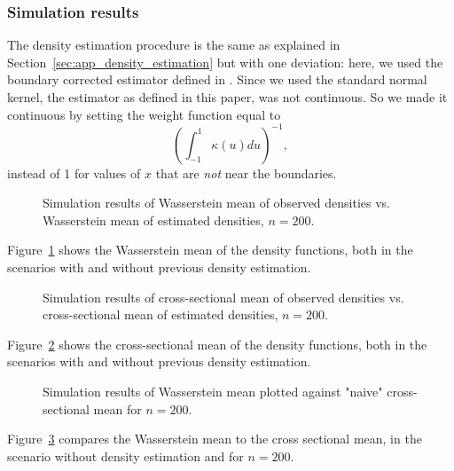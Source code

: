 \subsubsection{Simulation results}
\label{sec:illustration_simulation}
The density estimation procedure is the same as explained in Section~\ref{sec:app_density_estimation}
but with one deviation: here, we used the boundary corrected estimator defined in
\textcite{PetersenMüller2016}. Since we used the standard normal kernel, the estimator
as defined in this paper, was not continuous. So we made it continuous by setting the
weight function equal to
\begin{equation*}
    \left( \int_{-1}^{1} \kappa(u) du \right)^{-1},
\end{equation*}
instead of 1 for values of $x$ that are \textit{not} near the boundaries.

\begin{figure}[h]
    \centering
    
    \caption[Simulation results: observed vs estimated densities --- Wasserstein mean]{Simulation
    results of Wasserstein mean of observed densities vs. Wasserstein mean of estimated densities,
    $n=200$.}
    \label{fig:sim_f_denstimation}
\end{figure}
Figure~\ref{fig:sim_f_denstimation} shows the Wasserstein mean of the density functions,
both in the scenarios with and without previous density estimation.
\begin{figure}[h]
    \centering
    \resizebox{0.9\textwidth}{!}{}
    \caption[Simulation results: observed vs estimated densities --- cross-sectional mean]{Simulation
    results of cross-sectional mean of observed densities vs. cross-sectional mean of
    estimated densities, $n=200$.}
    \label{fig:sim_cs_denstimation}
\end{figure}
Figure~\ref{fig:sim_cs_denstimation} shows the cross-sectional mean of the density functions,
both in the scenarios with and without previous density estimation.

\begin{figure}[h]
    \centering
    \resizebox{0.9\textwidth}{!}{}
    \caption[Simulation results: Wasserstein mean vs cross-sectional mean]{Simulation
    results of Wasserstein mean plotted against "naive" cross-sectional mean for $n = 200$.}
    \label{fig:sim_f_vs_cs}
\end{figure}
Figure~\ref{fig:sim_f_vs_cs} compares the Wasserstein mean to the cross sectional mean,
in the scenario without density estimation and for $n=200$.

